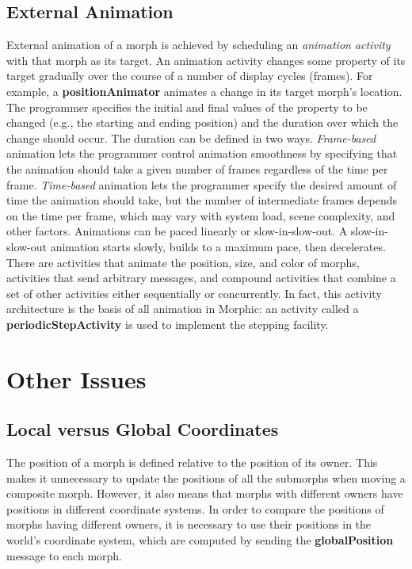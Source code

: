 \documentclass[letterpaper,10pt,english]{sphinxmanual}
\begin{document}
\subsection{External Animation}
\label{morphic:external-animation}
External animation of a morph is achieved by scheduling an \emph{animation activity} with that morph as its target. An animation activity changes some property of its target gradually over the course of a number of display cycles (frames). For example, a \textbf{positionAnimator} animates a change in its target morph's location. The programmer specifies the initial and final values of the property to be changed (e.g., the starting and ending position) and the duration over which the change should occur. The duration can be defined in two ways. \emph{Frame-based} animation lets the programmer control animation smoothness by specifying that the animation should take a given number of frames regardless of the time per frame. \emph{Time-based} animation lets the programmer specify the desired amount of time the animation should take, but the number of intermediate frames depends on the time per frame, which may vary with system load, scene complexity, and other factors. Animations can be paced linearly or slow-in-slow-out. A slow-in-slow-out animation starts slowly, builds to a maximum pace, then decelerates. There are activities that animate the position, size, and color of morphs, activities that send arbitrary messages, and compound activities that combine a set of other activities either sequentially or concurrently. In fact, this activity architecture is the basis of all animation in Morphic: an activity called a \textbf{periodicStepActivity} is used to implement the stepping facility.


\section{Other Issues}
\label{morphic:other-issues}

\subsection{Local versus Global Coordinates}
\label{morphic:local-versus-global-coordinates}
The position of a morph is defined relative to the position of its owner. This makes it unnecessary to update the positions of all the submorphs when moving a composite morph. However, it also means that morphs with different owners have positions in different coordinate systems. In order to compare the positions of morphs having different owners, it is necessary to use their positions in the world's coordinate system, which are computed by sending the \textbf{globalPosition} message to each morph.
\end{document}
